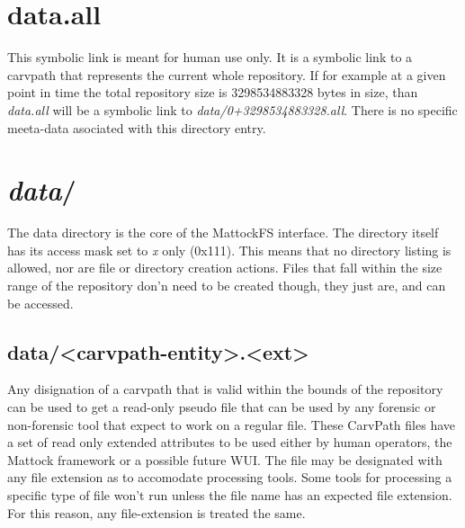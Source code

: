 \section{data.all}
This symbolic link is meant for human use only. It is a symbolic link to a carvpath that represents the current whole repository.
If for example at a given point in time the total repository size is 3298534883328 bytes in size, than \emph{data.all} will be a symbolic link to \emph{data/0+3298534883328.all}. There is no specific meeta-data asociated with this directory entry.
\section{\emph{data}/}
The data directory is the core of the MattockFS interface. The directory itself has its access mask set to \emph{x} only (0x111). This means that no directory listing is allowed, nor are file or directory creation actions. Files that fall within the size range of the repository don'n need to be created though, they just are, and can be accessed.
\subsection{data/<carvpath-entity>.<ext>}
Any disignation of a carvpath that is valid within the bounds of the repository can be used to get a read-only pseudo file that can be used by any forensic or non-forensic tool that expect to work on a regular file. These CarvPath files have a set of read only extended attributes to be used either by human operators, the Mattock framework or a possible future WUI. The file may be designated with any file extension as to accomodate processing tools. Some tools for processing a specific type of file won't run unless the file name has an expected file extension. For this reason, any file-extension is treated the same.
